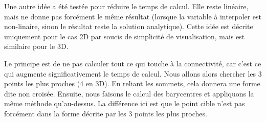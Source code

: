 \vspace{0.5cm}

Une autre idée a été testée pour réduire le temps de calcul. Elle reste linéaire, mais ne donne pas forcément le même résultat (lorsque la variable à interpoler est non-linaire, sinon le résultat reste la solution analytique). Cette idée est décrite uniquement pour le cas 2D par soucis de simplicité de visualisation, mais est similaire pour le 3D.

Le principe est de ne pas calculer tout ce qui touche à la connectivité, car c'est ce qui augmente significativement le temps de calcul.
Nous allons alors chercher les 3 points les plus proches (4 en 3D). En reliant les sommets, cela donnera une forme dite non croisée. 
Ensuite, nous faisons le calcul des barycentres et appliquons la même méthode qu'au-dessus.
La différence ici est que le point cible n'est pas forcément dans la forme décrite par les 3 points les plus proches.

\begin{center}
\end{center}



